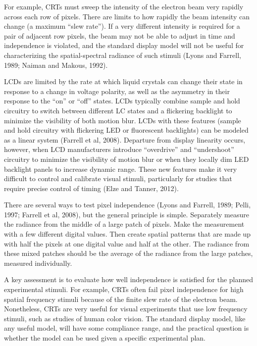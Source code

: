 \documentclass[
  letterpaper,
]{book}
\begin{document}
For example, CRTs must sweep the intensity of the electron beam very
rapidly across each row of pixels. There are limits to how rapidly the
beam intensity can change (a maximum ``slew rate''). If a very different
intensity is required for a pair of adjacent row pixels, the beam may
not be able to adjust in time and independence is violated, and the
standard display model will not be useful for characterizing the
spatial-spectral radiance of such stimuli (Lyons and Farrell, 1989;
Naiman and Makous, 1992).

LCDs are limited by the rate at which liquid crystals can change their
state in response to a change in voltage polarity, as well as the
asymmetry in their response to the ``on'' or ``off'' states. LCDs
typically combine sample and hold circuitry to switch between different
LC states and a flickering backlight to minimize the visibility of both
motion blur. LCDs with these features (sample and hold circuitry with
flickering LED or fluorescent backlights) can be modeled as a linear
system (Farrell et al, 2008). Departure from display linearity occurs,
however, when LCD manufacturers introduce ``overdrive'' and
``undershoot'' circuitry to minimize the visibility of motion blur or
when they locally dim LED backlight panels to increase dynamic range.
These new features make it very difficult to control and calibrate
visual stimuli, particularly for studies that require precise control of
timing (Elze and Tanner, 2012).

There are several ways to test pixel independence (Lyons and Farrell,
1989; Pelli, 1997; Farrell et al, 2008), but the general principle is
simple. Separately measure the radiance from the middle of a large patch
of pixels. Make the measurement with a few different digital values.
Then create spatial patterns that are made up with half the pixels at
one digital value and half at the other. The radiance from these mixed
patches should be the average of the radiance from the large patches,
measured individually.

A key assessment is to evaluate how well independence is satisfied for
the planned experimental stimuli. For example, CRTs often fail pixel
independence for high spatial frequency stimuli because of the finite
slew rate of the electron beam. Nonetheless, CRTs are very useful for
visual experiments that use low frequency stimuli, such as studies of
human color vision. The standard display model, like any useful model,
will have some compliance range, and the practical question is whether
the model can be used given a specific experimental plan.
\end{document}
